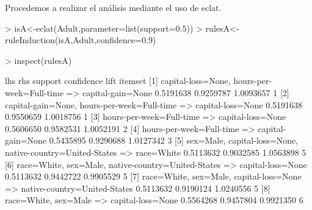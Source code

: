 \documentclass [a4paper] {article}
\begin{document}
{\bigskip
Procedemos a realizar el análisis mediante el uso de eclat.
\begin{Schunk}
\begin{Sinput}
> isA<-eclat(Adult,parameter=list(support=0.5))
> rulesA<-ruleInduction(isA,Adult,confidence=0.9)
\end{Sinput}
\end{Schunk}

\scriptsize
\begin{Schunk}
\begin{Sinput}
> inspect(rulesA)
\end{Sinput}
\begin{Soutput}
     lhs                               rhs                              support confidence      lift itemset
[1]  {capital-loss=None,                                                                                    
      hours-per-week=Full-time}     => {capital-gain=None}            0.5191638  0.9259787 1.0093657       1
[2]  {capital-gain=None,                                                                                    
      hours-per-week=Full-time}     => {capital-loss=None}            0.5191638  0.9550659 1.0018756       1
[3]  {hours-per-week=Full-time}     => {capital-loss=None}            0.5606650  0.9582531 1.0052191       2
[4]  {hours-per-week=Full-time}     => {capital-gain=None}            0.5435895  0.9290688 1.0127342       3
[5]  {sex=Male,                                                                                             
      capital-loss=None,                                                                                    
      native-country=United-States} => {race=White}                   0.5113632  0.9032585 1.0563898       5
[6]  {race=White,                                                                                           
      sex=Male,                                                                                             
      native-country=United-States} => {capital-loss=None}            0.5113632  0.9442722 0.9905529       5
[7]  {race=White,                                                                                           
      sex=Male,                                                                                             
      capital-loss=None}            => {native-country=United-States} 0.5113632  0.9190124 1.0240556       5
[8]  {race=White,                                                                                           
      sex=Male}                     => {capital-loss=None}            0.5564268  0.9457804 0.9921350       6

\end{Soutput}
\end{Schunk}}
\end{document}

